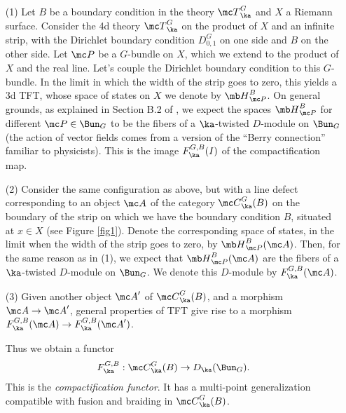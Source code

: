 \documentclass[11pt,reqno]{amsart}
\theoremstyle{plain}
\numberwithin{equation}{section}
\theoremstyle{definition}
\begin{document}
\begin{itemize}

\item[(1)] Let $B$ be a boundary condition in the theory ${\mc
    T}^G_\ka$ and $X$ a Riemann surface. Consider the 4d theory ${\mc
    T}^G_\ka$ on the product of $X$ and an infinite strip, with the
  Dirichlet boundary condition $D^G_{0,1}$ on one side and $B$ on the
  other side. Let ${\mc P}$ be a $G$-bundle on $X$, which we extend to
  the product of $X$ and the real line. Let's couple the Dirichlet
  boundary condition to this $G$-bundle. In the limit in which the
  width of the strip goes to zero, this yields a 3d TFT, whose space
  of states on $X$ we denote by ${\mb H}^B_{\mc P}$. On general
  grounds, as explained in Section B.2 of \cite{Ga1}, we expect the
  spaces ${\mb H}^B_{\mc P}$ for different ${\mc P} \in \Bun_G$ to be
  the fibers of a $\ka$-twisted $D$-module on $\Bun_G$ (the action of
  vector fields comes from a version of the ``Berry connection''
  familiar to physicists). This is the image $F^{G,B}_\ka(I)$ of the
  compactification map.

\bigskip
    
\item[(2)] Consider the same configuration as above, but with a line
  defect corresponding to an object ${\mc A}$ of the category ${\mc
    C}^G_\ka(B)$ on the boundary of the strip on which we have the
  boundary condition $B$, situated at $x \in X$ (see Figure
  \ref{fig1}). Denote the corresponding space of states, in the limit
  when the width of the strip goes to zero, by ${\mb H}^B_{\mc P}({\mc
    A})$. Then, for the same reason as in (1), we expect that ${\mb
    H}^B_{\mc P}({\mc A})$ are the fibers of a $\ka$-twisted
  $D$-module on $\Bun_G$. We denote this $D$-module by
  $F^{G,B}_\ka({\mc A})$.

\bigskip

\item[(3)] Given another object ${\mc A}'$ of ${\mc C}^G_\ka(B)$, and
  a morphism ${\mc A} \to {\mc A}'$, general properties of TFT give
  rise to a morphism $F^{G,B}_\ka({\mc A}) \to F^{G,B}_\ka({\mc A}')$.

Thus we obtain a functor
$$
F^{G,B}_\ka: {\mc C}^G_\ka(B) \to D_\ka(\Bun_G).
$$
This is the {\em compactification functor}. It has a multi-point
generalization compatible with fusion and braiding in ${\mc
  C}^G_\ka(B)$.


\end{itemize}
\end{document}

